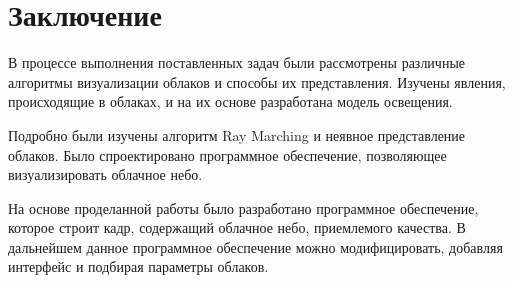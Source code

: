 \chapter{Заключение}
В процессе выполнения поставленных задач были рассмотрены различные алгоритмы визуализации облаков и способы их представления. Изучены явления, происходящие в облаках, и на их основе разработана модель освещения. 

Подробно были изучены алгоритм Ray Marching и неявное представление облаков. Было спроектировано программное обеспечение, позволяющее визуализировать облачное небо.

На основе проделанной работы было разработано программное обеспечение, которое строит кадр, содержащий облачное небо, приемлемого качества. В дальнейшем данное программное обеспечение можно модифицировать, добавляя интерфейс и подбирая параметры облаков.
